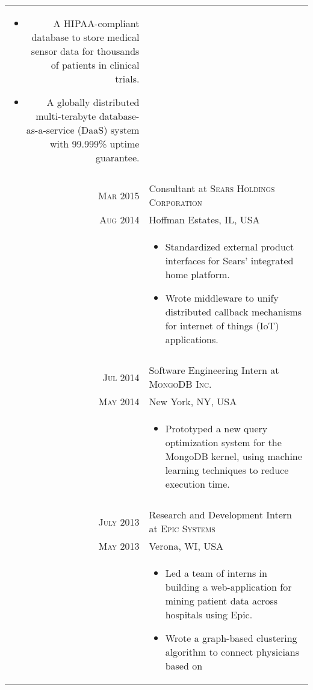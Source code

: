 \documentclass[a4paper,10pt]{article}
\begin{document}
\begin{longtable}{r|p{11cm}}
{\begin{itemize}
{			A critical resource management system used daily by over 7000 employees of the City of New York.
		}
		\item[]{
			A HIPAA-compliant database to store medical sensor data for thousands of patients
in clinical trials.
		}
		\item[]{
			A globally distributed multi-terabyte database-as-a-service (DaaS) system with
99.999\% uptime guarantee.
		}
	\end{itemize}
   }\\
 \multicolumn{2}{c}{} \\
 \nopagebreak \textsc{Mar 2015} & Consultant at \textsc{Sears Holdings Corporation}\\
 \nopagebreak \textsc{Aug 2014} & \small{Hoffman Estates, IL, USA}\\
 \nopagebreak & \footnotesize{
	\begin{itemize}
		\item[]{
			Standardized external product interfaces for Sears’ integrated home platform.
		}
		\item[]{
			Wrote middleware to unify distributed callback mechanisms for internet of things (IoT) applications.
		}
	\end{itemize}
   }\\
 \multicolumn{2}{c}{} \\
 \nopagebreak \textsc{Jul 2014} & Software Engineering Intern at \textsc{MongoDB Inc.}\\
 \nopagebreak \textsc{May 2014} & \small{New York, NY, USA} \\
 \nopagebreak	& \footnotesize{
	\begin{itemize}
		\item[]{
			Prototyped a new query optimization system for the MongoDB kernel, using
machine learning techniques to reduce execution time.
		}
	\end{itemize}
   }\\
 \multicolumn{2}{c}{} \\
 \nopagebreak \textsc{July 2013} & Research and Development Intern at \textsc{Epic Systems}\\
 \nopagebreak \textsc{May 2013} & \small{Verona, WI, USA} \\
 \nopagebreak	& \footnotesize{
	\begin{itemize}
		\item[]{
			Led a team of interns in building a web-application for mining patient data across
			hospitals using Epic.
		}
		\item[]{
			Wrote a graph-based clustering algorithm to connect physicians based on
}
\end{itemize}}
\end{longtable}
\end{document}
